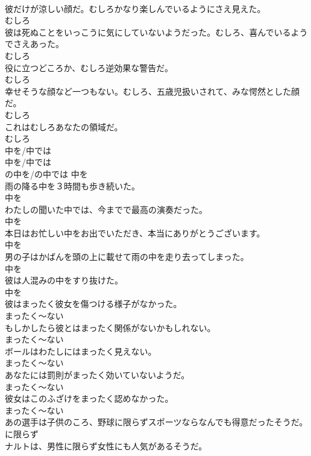 \documentclass[8pt]{extreport}
\begin{document}
\begin{CJK}{UTF8}{min}
\\	彼だけが涼しい顔だ。むしろかなり楽しんでいるようにさえ見えた。	
\\	むしろ
\\	彼は死ぬことをいっこうに気にしていないようだった。むしろ、喜んでいるようでさえあった。	
\\	むしろ
\\	役に立つどころか、むしろ逆効果な警告だ。	
\\	むしろ
\\	幸せそうな顔など一つもない。むしろ、五歳児扱いされて、みな愕然とした顔だ。	
\\	むしろ
\\	これはむしろあなたの領域だ。	
\\	むしろ
\\	中を/中では	
\\	中を/中では	
\\	の中を/の中では	中を
\\	雨の降る中を３時間も歩き続いた。	
\\	中を
\\	わたしの聞いた中では、今までで最高の演奏だった。	
\\	中を
\\	本日はお忙しい中をお出でいただき、本当にありがとうございます。	
\\	中を
\\	男の子はかばんを頭の上に載せて雨の中を走り去ってしまった。	
\\	中を
\\	彼は人混みの中をすり抜けた。	
\\	中を
\\	彼はまったく彼女を傷つける様子がなかった。	
\\	まったく～ない
\\	もしかしたら彼とはまったく関係がないかもしれない。	
\\	まったく～ない
\\	ボールはわたしにはまったく見えない。	
\\	まったく～ない
\\	あなたには罰則がまったく効いていないようだ。	
\\	まったく～ない
\\	彼女はこのふざけをまったく認めなかった。	
\\	まったく～ない
\\	あの選手は子供のころ、野球に限らずスポーツならなんでも得意だったそうだ。	
\\	に限らず
\\	ナルトは、男性に限らず女性にも人気があるそうだ。	

\end{CJK}
\end{document}
